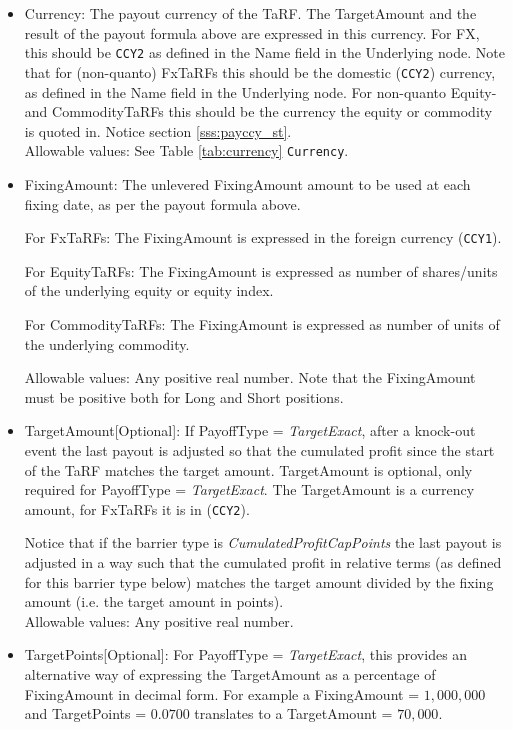 \begin{itemize}
    \item Currency: The payout currency of the TaRF. The TargetAmount and the result of the payout formula above are
expressed in this currency.  For FX, this should be \lstinline!CCY2! as defined in the Name field in the Underlying node.
Note that for (non-quanto) FxTaRFs this should be the domestic (\lstinline!CCY2!) currency, as defined in the Name field in
the Underlying node. For non-quanto Equity- and CommodityTaRFs this should be the currency the equity or commodity is quoted in.
Notice section \ref{sss:payccy_st}. \\
      Allowable values: See Table \ref{tab:currency} \lstinline!Currency!.

    \item FixingAmount: The unlevered FixingAmount amount to be used at each fixing date, as per the payout formula above.  
    
    For FxTaRFs: The FixingAmount is expressed in the foreign currency (\lstinline!CCY1!).
    
   For EquityTaRFs: The FixingAmount is expressed as number of shares/units of the underlying equity or equity index.
    
   For CommodityTaRFs: The FixingAmount is expressed as number of units of the underlying commodity.
    
      Allowable values: Any positive real number. Note that the FixingAmount must
be positive both for Long and Short positions.

    \item TargetAmount[Optional]: If PayoffType = \emph{TargetExact}, after a knock-out event the last payout is
      adjusted so that the cumulated profit since the start of the TaRF matches the target amount.  TargetAmount is
      optional, only required for PayoffType = \emph{TargetExact}. The TargetAmount is a currency amount, for FxTaRFs it
      is in (\lstinline!CCY2!).

      Notice that if the barrier type is \emph{CumulatedProfitCapPoints} the last payout is adjusted in a way such that
      the cumulated profit in relative terms (as defined for this barrier type below) matches the target amount divided
      by the fixing amount (i.e. the target amount in points). \\

      Allowable values: Any positive real number.

    \item TargetPoints[Optional]: For PayoffType = \emph{TargetExact}, this provides an alternative way of expressing
      the TargetAmount as a percentage of FixingAmount in decimal form. For example a FixingAmount = $1,000,000$ and
      TargetPoints = $0.0700$ translates to a TargetAmount = $70,000$. \\


\end{itemize}
